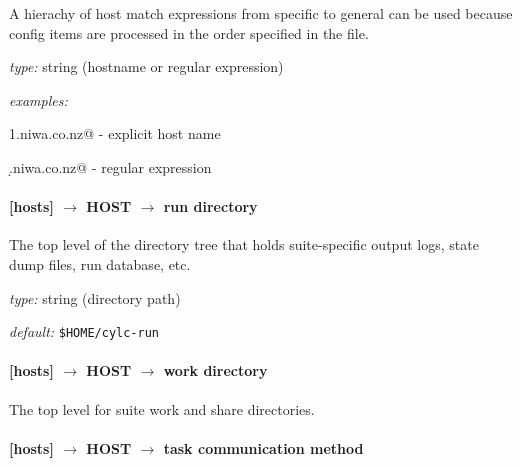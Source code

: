 A hierachy of host match expressions from specific to general can be 
used because config items are processed in the order specified in the
file.

\begin{myitemize}
\item {\em type:} string (hostname or regular expression)
\item {\em examples:}
\begin{myitemize}
    \item \lstinline@server1.niwa.co.nz@ - explicit host name
    \item  \lstinline@server\d.niwa.co.nz@ - regular expression
\end{myitemize}
\end{myitemize}

\paragraph[run directory]{[hosts] $\rightarrow$ HOST $\rightarrow$ run directory }

The top level of the directory tree that holds suite-specific output logs,
state dump files, run database, etc.

\begin{myitemize}
\item {\em type:} string (directory path)
\item {\em default:} \lstinline=$HOME/cylc-run=
\end{myitemize}

\paragraph[work directory]{[hosts] $\rightarrow$ HOST $\rightarrow$ work directory }

The top level for suite work and share directories.



\paragraph[task communication method]{[hosts] $\rightarrow$ HOST $\rightarrow$ task communication method }

